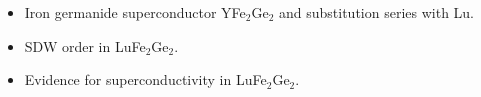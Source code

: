 \begin{frame}[label=TitlePage]
\begin{itemize}
\item
Iron germanide superconductor YFe$_2$Ge$_2$ and substitution series with  Lu.
\item
SDW order in LuFe$_2$Ge$_2$.
\item
Evidence for superconductivity in LuFe$_2$Ge$_2$.
\end{itemize}
%
%
%
%
%


\end{frame}
